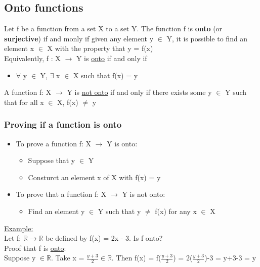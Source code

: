 \documentclass{article}
\begin{document}
\subsection{Onto functions}

Let f be a function from a set X to a set Y. The function f is \textbf{onto} (or \textbf{surjective}) if and monly if given any element y $\in$ Y, it is possible to find an element x $\in$ X with the property that y = f(x) \\

Equivalently, f : X $\longrightarrow$ Y is \underline{onto} if and only if
\begin{itemize}
\item $\forall$ y $\in$ Y, $\exists$ x $\in$ X such that f(x) = y
\end{itemize}

A function f: X $\longrightarrow$ Y is \underline{not onto} if and only if there exists some y $\in$ Y such that for all x $\in$ X, f(x) $\neq$ y \\


\subsubsection{Proving if a function is onto}

\begin{itemize}

\item To prove a function f: X $\longrightarrow$ Y is onto:
\begin{itemize}
\item Suppose that y $\in$ Y
\item Consturct an element x of X with f(x) = y
\end{itemize}

\item To prove that a function f: X $\longrightarrow$ Y is not onto:
\begin{itemize}
\item Find an element y $\in$ Y such that y $\neq$ f(x) for any x $\in$ X
\end{itemize}

\end{itemize}

\underline{Example:} \\
Let f: $\mathbb{R} \longrightarrow \mathbb{R}$ be defined by f(x) = 2x - 3. Is f onto? \\

Proof that f is \underline{onto}: \\
Suppose y $\in \mathbb{R}$. Take x = $\frac{y+3}{2} \in \mathbb{R}$. Then f(x) = f($\frac{y+3}{2}$) = 2($\frac{y+3}{2}$)-3 = y+3-3 = y \\
\end{document}
